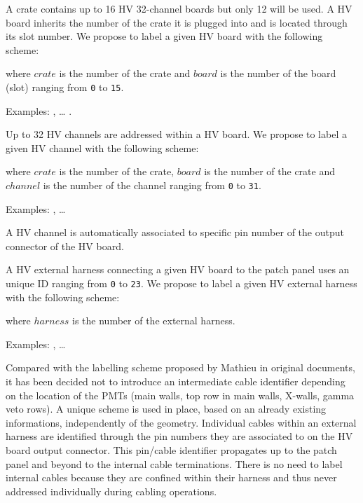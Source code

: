 \documentclass[12pt,a4paper]{article}
\begin{document}
\vskip 10pt A crate contains up to 16 HV 32-channel boards but only 12
will be  used.  A  HV board  inherits the  number of  the crate  it is
plugged into  and is located through  its slot number.  We  propose to
label a given HV board with the following scheme:
\begin{center}
 \end{center}
where \texttt{$crate$} is the number of the crate and \texttt{$board$}
is  the  number  of  the  board  (slot)  ranging  from  \texttt{0}  to
\texttt{15}.
\vskip 10pt
\par\noindent Examples: ,  \dots
{}.

\vskip 10pt
\par\noindent Up  to 32 HV channels are addressed within a HV board.
 We propose to label a given HV channel with the following scheme:
\begin{center}
 \end{center}
where \texttt{$crate$} is the number of the crate,
  \texttt{$board$} is the number of the crate
and  \texttt{$channel$} is the number of the channel
ranging from
\texttt{0} to \texttt{31}.
\par\noindent Examples: , \dots
{}

\vskip 10pt
A HV channel is automatically associated to specific pin number of
the output connector of the HV board. 

\vskip 10pt A  HV external harness connecting a given  HV board to the
patch panel uses an unique  ID ranging from \texttt{0} to \texttt{23}.
We propose  to label a  given HV  external harness with  the following
scheme:
\begin{center}
 \end{center}
where \texttt{$harness$} is the number of the external harness.
\par\noindent Examples: , \dots
{}

\vskip 10pt Compared with the  labelling scheme proposed by Mathieu in
original  documents,  it   has  been  decided  not   to  introduce  an
intermediate cable  identifier depending on  the location of  the PMTs
(main walls,  top row in  main walls,  X-walls, gamma veto rows).  A unique
scheme   is  used in place,   based   on  an   already  existing   informations,
independently of  the geometry.  Individual cables  within an external
harness are identified through the  pin numbers they are associated to
on  the   HV  board  output  connector.    This  pin/cable  identifier
propagates up  to the  patch panel  and beyond  to the  internal cable
terminations.  There is no need  to label internal cables because they
are   confined  within   their  harness   and  thus   never  addressed
individually during cabling operations.
\end{document}
